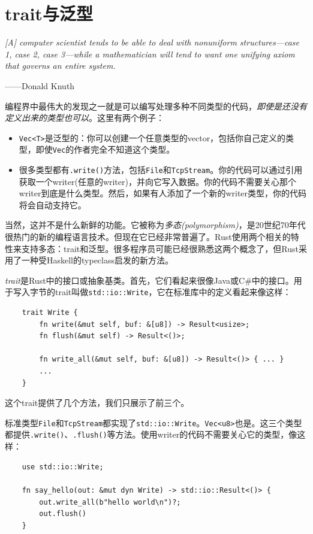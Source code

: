 \chapter{trait与泛型}\label{ch11}

\emph{[A] computer scientist tends to be able to deal with nonuniform structures—case 1, case 2, case 3—while a mathematician will tend to want one unifying axiom that governs an entire system.}

\begin{flushright}
    ——Donald Knuth
\end{flushright}

编程界中最伟大的发现之一就是可以编写处理多种不同类型的代码，\emph{即使是还没有定义出来的类型也可以}。这里有两个例子：
\begin{itemize}
    \item \texttt{Vec<T>}是泛型的：你可以创建一个任意类型的vector，包括你自己定义的类型，即使\texttt{Vec}的作者完全不知道这个类型。
    \item 很多类型都有\texttt{.write()}方法，包括\texttt{File}和\texttt{TcpStream}。你的代码可以通过引用获取一个writer(任意的writer)，并向它写入数据。你的代码不需要关心那个writer到底是什么类型。然后，如果有人添加了一个新的writer类型，你的代码将会自动支持它。
\end{itemize}

当然，这并不是什么新鲜的功能。它被称为\emph{多态(polymorphism)}，是20世纪70年代很热门的新的编程语言技术。但现在它已经非常普遍了。Rust使用两个相关的特性来支持多态：trait和泛型。很多程序员可能已经很熟悉这两个概念了，但Rust采用了一种受Haskell的typeclass启发的新方法。

\emph{trait}是Rust中的接口或抽象基类。首先，它们看起来很像Java或C\#中的接口。用于写入字节的trait叫做\texttt{std::io::Write}，它在标准库中的定义看起来像这样：
\begin{verbatim}
    trait Write {
        fn write(&mut self, buf: &[u8]) -> Result<usize>;
        fn flush(&mut self) -> Result<()>;

        fn write_all(&mut self, buf: &[u8]) -> Result<()> { ... }
        ...
    }
\end{verbatim}

这个trait提供了几个方法，我们只展示了前三个。

标准类型\texttt{File}和\texttt{TcpStream}都实现了\texttt{std::io::Write}。\texttt{Vec<u8>}也是。这三个类型都提供\texttt{.write()}、\texttt{.flush()}等方法。使用writer的代码不需要关心它的类型，像这样：
\begin{verbatim}
    use std::io::Write;

    fn say_hello(out: &mut dyn Write) -> std::io::Result<()> {
        out.write_all(b"hello world\n")?;
        out.flush()
    }
\end{verbatim}


